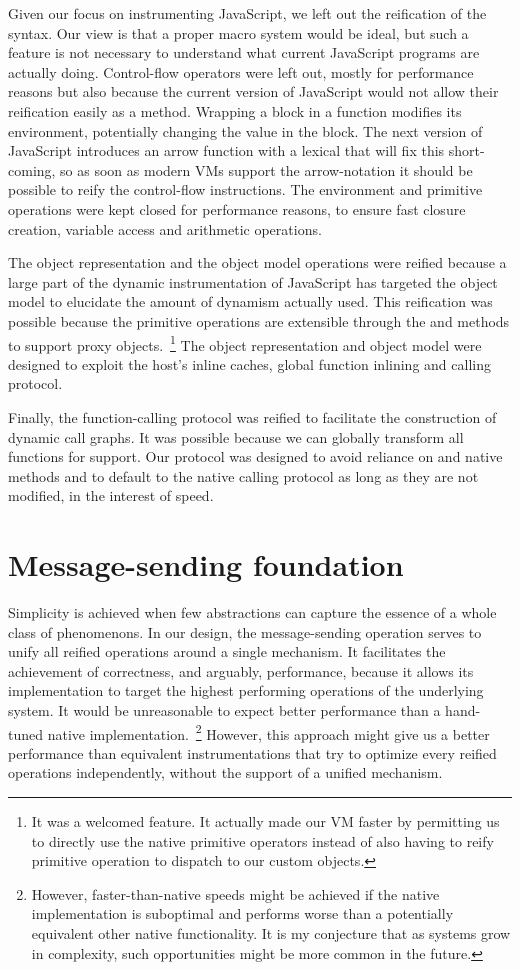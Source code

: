 Given our focus on instrumenting JavaScript, we left out the reification of
the syntax. Our view is that a proper macro system would be ideal, but such a
feature is not necessary to understand what current JavaScript programs are
actually doing. Control-flow operators were left out, mostly for performance
reasons but also because the current version of JavaScript would not allow
their reification easily as a method. Wrapping a block in a function modifies
its environment, potentially changing the  value in the block. The
next version of JavaScript introduces an arrow function with a lexical
 that will fix this short-coming, so as soon as modern VMs support the
arrow-notation it should be possible to reify the control-flow instructions.
The environment and primitive operations were kept closed for performance
reasons, to ensure fast closure creation, variable access and arithmetic
operations.

The object representation and the object model operations were reified because
a large part of the dynamic instrumentation of JavaScript has targeted the
object model to elucidate the amount of dynamism actually used. This
reification was possible because the primitive operations are extensible
through the  and  methods to support proxy
objects.~\footnote{It was a welcomed feature. It actually made our VM faster by
permitting us to directly use the native primitive operators instead of also
having to reify primitive operation to dispatch to our custom objects.} The
object representation and object model were designed to exploit the host's
inline caches, global function inlining and calling protocol.  

Finally, the function-calling protocol was reified to facilitate the
construction of dynamic call graphs. It was possible because we can globally
transform all functions for support. Our protocol was designed to avoid
reliance on  and  native methods and to default to the
native calling protocol as long as they are not modified, in the interest of
speed.

\section{Message-sending foundation}
Simplicity is achieved when few abstractions can capture the essence of a whole
class of phenomenons. In our design, the message-sending operation serves to
unify all reified operations around a single mechanism. It facilitates the
achievement of correctness, and arguably, performance, because it allows its
implementation to target the highest performing operations of the underlying
system. It would be unreasonable to expect better performance than a hand-tuned
native implementation.~\footnote{However, faster-than-native
speeds might be achieved if the native implementation is suboptimal and performs
worse than a potentially equivalent other native functionality. It is my
conjecture that as systems grow in complexity, such opportunities might be
more common in the future.} However, this approach might give us a better
performance than equivalent instrumentations that try to optimize every reified
operations independently, without the support of a unified mechanism.

